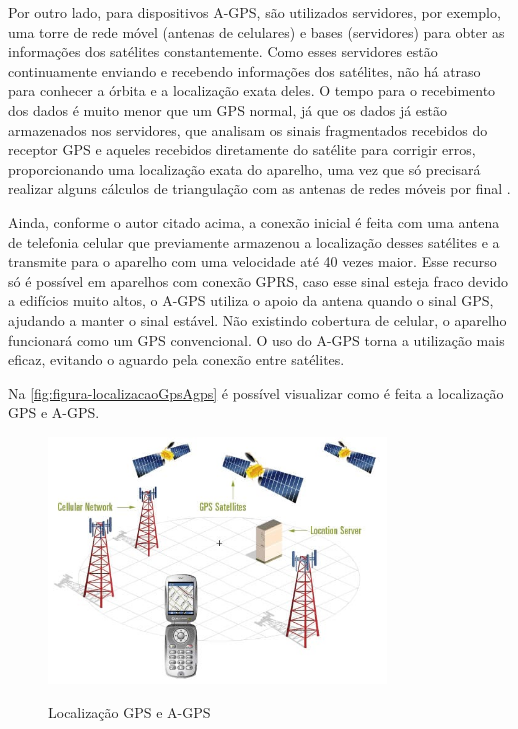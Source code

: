 Por outro lado, para dispositivos A-GPS, são utilizados servidores, por exemplo, uma torre de rede móvel (antenas de celulares) e bases (servidores) para obter as informações dos satélites constantemente. Como esses servidores estão continuamente enviando e recebendo informações dos satélites, não há atraso para conhecer a órbita e a localização exata deles. O tempo para o recebimento dos dados é muito menor que um GPS normal, já que os dados já estão armazenados nos servidores, que analisam os sinais fragmentados recebidos do receptor GPS e aqueles recebidos diretamente do satélite para corrigir erros, proporcionando uma localização exata do aparelho, uma vez que só precisará realizar alguns cálculos de triangulação com as antenas de redes móveis por final \cite{oficinanetagps:2018}.

Ainda, conforme o autor citado acima, a conexão inicial é feita com uma antena de telefonia celular que previamente armazenou a localização desses satélites e a transmite para o aparelho com uma velocidade até 40 vezes maior. Esse recurso só é possível em aparelhos com conexão GPRS, caso esse sinal esteja fraco devido a edifícios muito altos, o A-GPS utiliza o apoio da antena quando o sinal GPS, ajudando a manter o sinal estável. Não existindo cobertura de celular, o aparelho funcionará como um GPS convencional. O uso do A-GPS torna a utilização mais eficaz, evitando o aguardo pela conexão entre satélites. 

Na \autoref{fig:figura-localizacaoGpsAgps} é possível visualizar como é feita a localização GPS e A-GPS.

\begin{figure}[H]
    \centering
    \caption{Localização GPS e A-GPS}
    \includegraphics[width=0.8\textwidth]{./dados/figuras/fig5}
    \label{fig:figura-localizacaoGpsAgps}
\end{figure}

